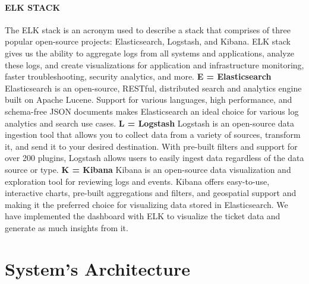 \documentclass[a4paper,12pt]{report}
\begin{document}
    \subsubsection{ELK STACK}
    The ELK\cite{ELK} stack is an acronym used to describe a stack that comprises of three popular open-source projects: Elasticsearch, Logstash, and Kibana. ELK stack gives us the ability to aggregate logs from all systems and applications, analyze these logs, and create visualizations for application and infrastructure monitoring, faster troubleshooting, security analytics, and more. 
    \newline\newline \textbf{E = Elasticsearch}
    \newline\newline
    Elasticsearch is an open-source, RESTful, distributed search and analytics engine built on Apache Lucene. Support for various languages, high performance, and schema-free JSON documents makes Elasticsearch an ideal choice for various log analytics and search use cases.
    \newline\newline \textbf{L = Logstash}
    \newline\newline
    Logstash is an open-source data ingestion tool that allows you to collect data from a variety of sources, transform it, and send it to your desired destination. With pre-built filters and support for over 200 plugins, Logstash allows users to easily ingest data regardless of the data source or type.
    \newline\newline \textbf{K = Kibana}
    \newline\newline
    Kibana is an open-source data visualization and exploration tool for reviewing logs and events. Kibana offers easy-to-use, interactive charts, pre-built aggregations and filters, and geospatial support and making it the preferred choice for visualizing data stored in Elasticsearch.
    \newline
    We have implemented the dashboard with ELK to visualize the ticket data and generate as much insights from it.


    \chapter{System's Architecture}\label{SystemArchitechture}
\end{document}
